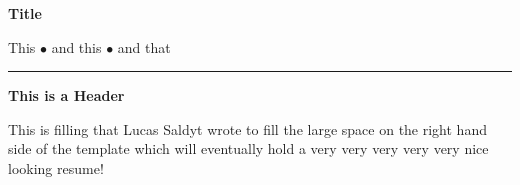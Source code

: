 \documentclass[letterpaper,11pt]{article}
\begin{document}
\begin{center}
\textbf{\Large Title}
\end{center}
\vspace{-1.5\baselineskip}
\begin{center}
    This $\bullet$ and this $\bullet$ and that
\end{center}
\vspace{-1.5\baselineskip}
\rule{1.0\textwidth}{1.5pt}
\vspace{0.1\baselineskip}
\newline
\begin{minipage}{0.1\textwidth}
    \textbf{This is a Header}
\end{minipage}
\hspace{0.04\textwidth}
\begin{minipage}{0.8\textwidth}
    This is filling that Lucas Saldyt wrote to fill the large space on the right hand side of the template which will eventually hold a very very very very very nice looking resume!
\end{minipage}
\end{document}
